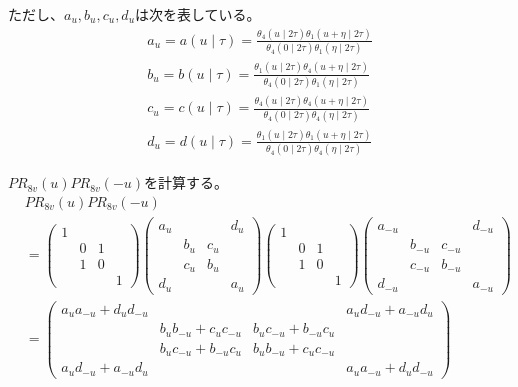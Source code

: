 \documentclass[12pt,b5paper]{ltjsarticle}
\begin{document}
ただし、$a_{u},b_{u},c_{u},d_{u}$は次を表している。
\begin{gather}
 a_{u} = a(u\mid\tau)
 = \frac{\theta_{4}(u\mid 2\tau) \theta_{1}(u+\eta\mid 2\tau)}
 {\theta_{4}(0\mid 2\tau) \theta_{1}(\eta\mid 2\tau)}
 \\
 b_{u} = b(u\mid\tau)
 = \frac{\theta_{1}(u\mid 2\tau) \theta_{4}(u+\eta\mid 2\tau)}
 {\theta_{4}(0\mid 2\tau) \theta_{1}(\eta\mid 2\tau)}
 \\
 c_{u} = c(u\mid\tau)
 = \frac{\theta_{4}(u\mid 2\tau) \theta_{4}(u+\eta\mid 2\tau)}
 {\theta_{4}(0\mid 2\tau) \theta_{4}(\eta\mid 2\tau)}
 \\
 d_{u} = d(u\mid\tau)
 = \frac{\theta_{1}(u\mid 2\tau) \theta_{1}(u+\eta\mid 2\tau)}
 {\theta_{4}(0\mid 2\tau) \theta_{4}(\eta\mid 2\tau)}
\end{gather}

$P R_{8v}(u) P R_{8v}(-u)$を計算する。
\begin{align}
& P R_{8v}(u) P R_{8v}(-u) \\
  &=
  \begin{pmatrix}1 &&& \\ &0&1&\\  &1&0&\\  &&&1 \end{pmatrix}
  \begin{pmatrix} a_{u} &&& d_{u} \\ &b_{u}&c_{u}&\\  &c_{u}&b_{u}&\\ d_{u}&&&a_{u} \end{pmatrix}
  \begin{pmatrix}1 &&& \\ &0&1&\\  &1&0&\\  &&&1 \end{pmatrix}
  \begin{pmatrix} a_{-u} &&& d_{-u} \\ &b_{-u}&c_{-u}&\\  &c_{-u}&b_{-u}&\\ d_{-u}&&&a_{-u} \end{pmatrix}\\
 &=
 \begin{pmatrix}
 a_{u}a_{-u}+d_{u}d_{-u} & & & a_{u}d_{-u}+a_{-u}d_{u} \\
 & b_{u}b_{-u}+c_{u}c_{-u} & b_{u}c_{-u}+b_{-u}c_{u} & \\
 & b_{u}c_{-u}+b_{-u}c_{u} & b_{u}b_{-u}+c_{u}c_{-u} & \\
 a_{u}d_{-u}+a_{-u}d_{u} & & & a_{u}a_{-u}+d_{u}d_{-u}
 \end{pmatrix}
\end{align}
\end{document}
